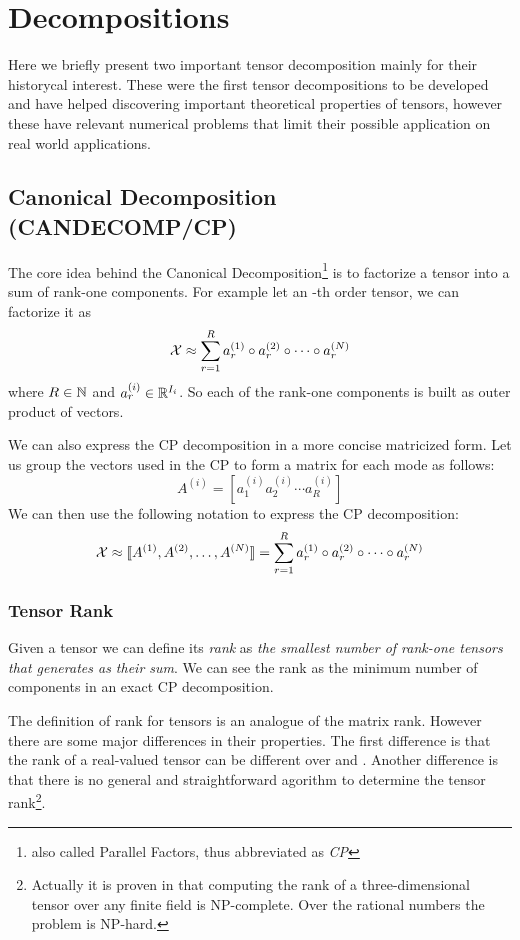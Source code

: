 \chapter{Decompositions}
Here we briefly present two important tensor decomposition mainly for their historycal interest. These were the first tensor decompositions to be developed and have helped discovering important theoretical properties of tensors, however these have relevant numerical problems that limit their possible application on real world applications.

\section{Canonical Decomposition (CANDECOMP/CP)}
The core idea behind the Canonical Decomposition\footnote{also called Parallel Factors, thus abbreviated as \emph{CP}} is to factorize a tensor into a sum of rank-one components. For example let \X an \N-th order tensor, we can factorize it as
\begin{equation}
  \mathcal{X} \approx \sum_{r = 1}^R a_r^{(1)} \circ a_r^{(2)} \circ \cdots \circ a_r^{(N)}
\end{equation}
where $R \in \mathbb{N}$ and $a_r^{(i)} \in \mathbb{R}^{I_i}$. So each of the rank-one components is built as outer product of \N vectors.

We can also express the CP decomposition in a more concise matricized form.
Let us group the vectors used in the CP to form a matrix for each mode  as follows:
\begin{equation*}
  A^{(i)} = [ a^{(i)}_1 a^{(i)}_2 \cdots a^{(i)}_R ]
\end{equation*}
We can then use the following notation to express the CP decomposition:
\begin{equation*}
  \mathcal{X} \approx \llbracket A^{(1)}, A^{(2)}, \ldots, A^{(N)} \rrbracket = \sum_{r = 1}^R a_r^{(1)} \circ a_r^{(2)} \circ \cdots \circ a_r^{(N)}
\end{equation*}

\subsection{Tensor Rank}
Given a tensor \X we can define its \emph{rank} as \emph{the smallest number of rank-one tensors that generates \X as their sum}. We can see the rank as the minimum number of components in an exact CP decomposition.

The definition of rank for tensors is an analogue of the matrix rank. However there are some major differences in their properties.
The first difference is that the rank of a real-valued tensor can be different over \RR and \CC {}. Another difference is that there is no general and straightforward agorithm to determine the tensor rank\footnote{Actually it is proven in \cite{rankNP} that computing the rank of a three-dimensional tensor over any finite field is NP-complete. Over the rational numbers the problem is NP-hard.}.

